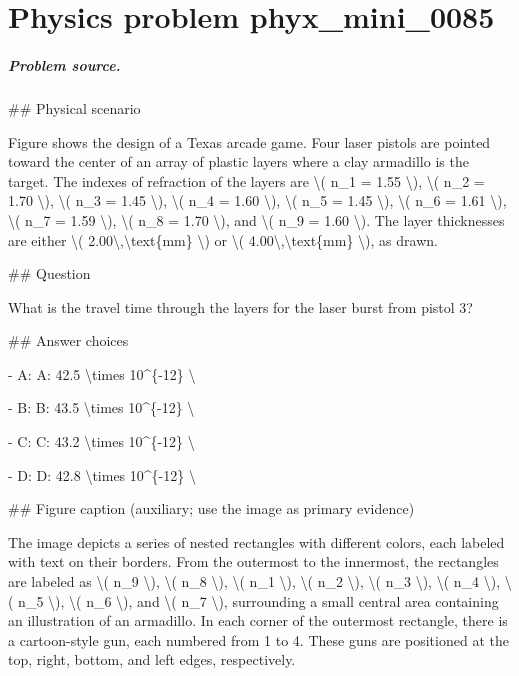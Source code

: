
\chapter{Physics problem phyx\_mini\_0085}
\label{ch:PhyXMiniProblems_problem_phyx_mini_0085}

\paragraph{Problem source.}
\#\# Physical scenario

Figure shows the design of a Texas arcade game. Four laser pistols are pointed toward the center of an array of plastic layers where a clay armadillo is the target. The indexes of refraction of the layers are \textbackslash{}( n\_1 = 1.55 \textbackslash{}), \textbackslash{}( n\_2 = 1.70 \textbackslash{}), \textbackslash{}( n\_3 = 1.45 \textbackslash{}), \textbackslash{}( n\_4 = 1.60 \textbackslash{}), \textbackslash{}( n\_5 = 1.45 \textbackslash{}), \textbackslash{}( n\_6 = 1.61 \textbackslash{}), \textbackslash{}( n\_7 = 1.59 \textbackslash{}), \textbackslash{}( n\_8 = 1.70 \textbackslash{}), and \textbackslash{}( n\_9 = 1.60 \textbackslash{}). The layer thicknesses are either \textbackslash{}( 2.00\textbackslash{},\textbackslash{}text\{mm\} \textbackslash{}) or \textbackslash{}( 4.00\textbackslash{},\textbackslash{}text\{mm\} \textbackslash{}), as drawn.

\#\# Question

What is the travel time through the layers for the laser burst from pistol 3?

\#\# Answer choices

- A: A: 42.5 \textbackslash{}times 10\textasciicircum{}\{-12\} \textbackslash{}

- B: B: 43.5 \textbackslash{}times 10\textasciicircum{}\{-12\} \textbackslash{}

- C: C: 43.2 \textbackslash{}times 10\textasciicircum{}\{-12\} \textbackslash{}

- D: D: 42.8 \textbackslash{}times 10\textasciicircum{}\{-12\} \textbackslash{}

\#\# Figure caption (auxiliary; use the image as primary evidence)

The image depicts a series of nested rectangles with different colors, each labeled with text on their borders. From the outermost to the innermost, the rectangles are labeled as \textbackslash{}( n\_9 \textbackslash{}), \textbackslash{}( n\_8 \textbackslash{}), \textbackslash{}( n\_1 \textbackslash{}), \textbackslash{}( n\_2 \textbackslash{}), \textbackslash{}( n\_3 \textbackslash{}), \textbackslash{}( n\_4 \textbackslash{}), \textbackslash{}( n\_5 \textbackslash{}), \textbackslash{}( n\_6 \textbackslash{}), and \textbackslash{}( n\_7 \textbackslash{}), surrounding a small central area containing an illustration of an armadillo. In each corner of the outermost rectangle, there is a cartoon-style gun, each numbered from 1 to 4. These guns are positioned at the top, right, bottom, and left edges, respectively.

